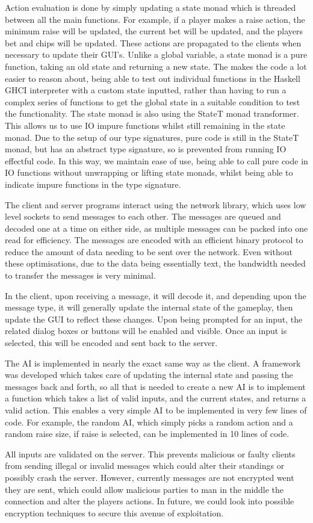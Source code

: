 Action evaluation is done by simply updating a state monad which is threaded
between all the main functions. For example, if a player makes a raise action,
the minimum raise will be updated, the current bet will be updated, and
the players bet and chips will be updated. These actions are propagated to the
clients when necessary to update their GUI's. Unlike a global variable,
a state monad is a pure function, taking an old state and returning a new
state. The makes the code a lot easier to reason about, being able to test
out individual functions in the Haskell GHCI interpreter with a custom state
inputted, rather than having to run a complex series of functions to get the
global state in a suitable condition to test the functionality. The state
monad is also using the StateT monad transformer. This allows us to use IO
impure functions whilst still remaining in the state monad. Due to the
setup of our type signatures, pure code is still in the StateT monad, but
has an abstract type signature, so is prevented from running IO effectful code.
In this way, we maintain ease of use, being able to call pure code in IO
functions without unwrapping or lifting state monads, whilst being able to
indicate impure functions in the type signature.

The client and server programs interact using the network library, which
uses low level sockets to send messages to each other. The messages are queued
and decoded one at a time on either side, as multiple messages can be packed
into one read for efficiency. The messages are encoded with an efficient binary
protocol to reduce the amount of data needing to be sent over the network.
Even without these optimisations, due to the data being essentially text, the
bandwidth needed to transfer the messages is very minimal.

In the client, upon receiving a message, it will decode it, and depending upon
the message type, it will generally update the internal state of the gameplay,
then update the GUI to reflect these changes. Upon being prompted for an
input, the related dialog boxes or buttons will be enabled and visible.
Once an input is selected, this will be encoded and sent back to the server.

The AI is implemented in nearly the exact same way as the client. A framework
was developed which takes care of updating the internal state and passing the
messages back and forth, so all that is needed to create a new AI is to
implement a function which takes a list of valid inputs, and the current
states, and returns a valid action. This enables a very simple AI to be
implemented in very few lines of code. For example, the random AI, which simply
picks a random action and a random raise size, if raise is selected, can
be implemented in 10 lines of code.

All inputs are validated on the server. This prevents malicious or faulty
clients from sending illegal or invalid messages which could alter their
standings or possibly crash the server. However, currently messages are not
encrypted went they are sent, which could allow malicious parties to man in the
middle the connection and alter the players actions. In future, we could look
into possible encryption techniques to secure this avenue of exploitation.

